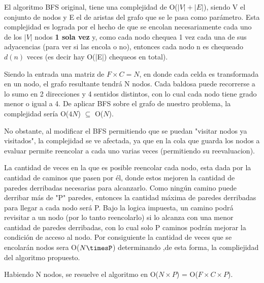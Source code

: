  El algoritmo BFS original, tiene una complejidad de O($|V|+|E|$), siendo V el conjunto de nodos y E el de aristas del grafo que se le pasa como parámetro. Esta complejidad es lograda por el hecho de que se encolan necesariamente cada uno de los $|V|$ nodos {\bf 1 sola vez} y, como cada nodo chequea 1 vez cada una de sus adyacencias (para ver si las encola o no), entonces cada nodo n es chequeado $d(n)$ veces (es decir hay O(|E|) chequeos en total). 

Siendo la entrada una matriz de $F \times C = N$, en donde cada celda es transformada en un nodo, el grafo resultante tendrá N nodos. Cada baldosa puede recorrerse a lo sumo en 2 direcciones y 4 sentidos distintos, con lo cual cada nodo tiene grado menor o igual a 4. De aplicar BFS sobre el grafo de nuestro problema, la complejidad sería O($4N$) $\subseteq$ O($N$).

No obstante, al modificar el BFS permitiendo que se puedan "visitar nodos ya visitados", la complejidad se ve afectada, ya que en la cola que guarda los nodos a evaluar permite reencolar a cada uno varias veces (permitiendo su reevaluacion).

La cantidad de veces en la que es posible reencolar cada nodo, esta dada por la cantidad de caminos que pasen por él, donde estos mejoren la cantidad de paredes derribadas necesarias para alcanzarlo. Como ningún camino puede derribar más de "P" paredes, entonces la cantidad máxima de paredes derribadas para llegar a cada nodo será P. Bajo la logica impuesta, un camino podrá revisitar a un nodo (por lo tanto reencolarlo) si lo alcanza con una menor cantidad de paredes derribadas, con lo cual solo P caminos podrán mejorar la condición de acceso al nodo. Por consiguiente la cantidad de veces que se encolarán nodos sera O($N\timesP$) determinando ,de esta forma, la compliejidad del algoritmo propuesto.












 Habiendo N nodos, se resuelve el algoritmo en O($N \times P$) = O($F \times C \times P$).